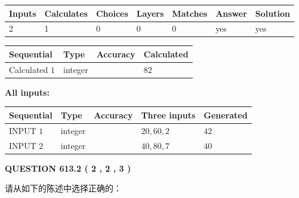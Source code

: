 \documentclass{ctexart}
\begin{document}
 
\noindent{}
 
 

 
   
   
   
   
\noindent\begin{tabular}{|l|l|l|l|l|l|l|}
 \hline
Inputs & Calculates & Choices & Layers & Matches & Answer & Solution \\ \hline
 2  & 
 1  & 
 0
  & 
 0  & 
 0  & 
  yes & 
  yes 
  \\ \hline
 \end{tabular}
   
   
   
   
\noindent{}
   
   
  
  
\noindent\begin{tabular}{|l|l|l|l|}
\hline
 Sequential & Type & Accuracy & Calculated \\ 
\hline
 
 
  Calculated $  1 $ & integer &  & 
  $ 82 $ 
 \\  \hline  
 \end{tabular}
   
   
   
   
\noindent\vspace{0.1in}\hspace{-0.08in} {\textbf{\Large{All inputs: }}}
   
   
  
  
\noindent\begin{tabular}{|l|l|l|l|l|}
\hline
 Sequential & Type & Accuracy & Three inputs & Generated \\ 
\hline
 
 
  INPUT $  1 $ & integer &  & $
 20
 , 
 60
 , 
 2
 $ & $ 42 $ 
 \\  \hline  
 
 
  INPUT $  2 $ & integer &  & $
 40
 , 
 80
 , 
 7
 $ & $ 40 $ 
 \\  \hline  
 \end{tabular}
   
   
  
\vspace{0.2in}
  
{\textbf{\Large{QUESTION
613.2 
 ( 2 , 2 , 3 )
}}}
  
  
请从如下的陈述中选择正确的：
 
\end{document}
